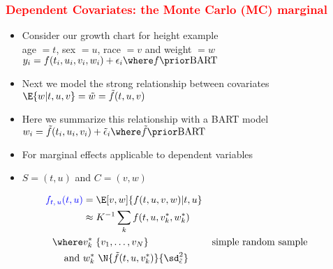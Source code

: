 \documentclass[11pt,dvipsnames,usenames,times]{beamer}
\newcommand*{\BART}{\mathrm{BART}\ }
\newcommand*{\red}[1]{\textcolor{red}{#1}}%
\begin{document}
\begin{frame}\frametitle{\bf%
\textcolor{red}{Dependent Covariates: the Monte Carlo (MC) marginal}}

\begin{itemize}
\item Consider our growth chart for height example\\
age $=t$, sex $=u$, race $=v$ and weight $=w$\\
$y_i = f(t_i, u_i, v_i, w_i) + \epsilon_i \where f \prior \BART$
\item Next we model the strong relationship between covariates\\
  $\E{w|t, u, v}=\tilde{w}=\tilde{f}(t, u, v)$
\item Here we summarize this relationship with a BART model
$w_i=\tilde{f}(t_i, u_i, v_i)+\tilde{\epsilon}_i \where \tilde{f} \prior \BART$
\item For marginal effects applicable to dependent variables
\item $S=(t, u)$ and $C=(v, w)$
\end{itemize}
\begin{align*}
\textcolor{blue}{f_{t,\,u}(t, u)}&=\E[v,w]{f(t, u, v, w)|t, u} \\ %
&\approx K^{-1} \sum_k f(t, u, v^*_k, {w}^*_k) \\ %
\where& v^*_k ~ \{v_1, \dots, v_N\} & & \mbox{simple random sample} \\
\mbox{and\ }& {w}^*_k ~ \N{\tilde{f}(t, u, v^*_k)}{\sd^2_{\tilde{\epsilon}}}  
\end{align*}

\end{frame}
\end{document}

